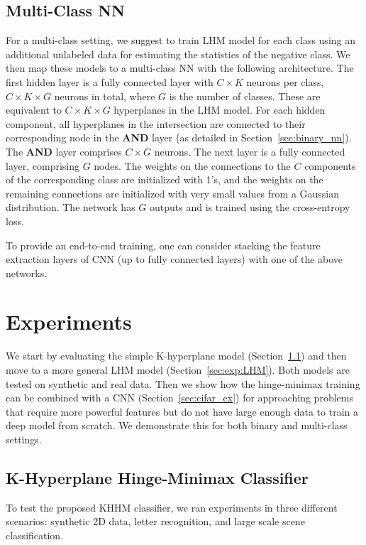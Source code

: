 \documentclass[twoside,11pt]{article}
\begin{document}
\subsection{Multi-Class NN}\label{sec:mc_nn}
For a multi-class setting, we suggest to train LHM model for each class using an additional unlabeled data for estimating the statistics of the negative class. We then map these models to a multi-class NN with the following architecture. The first hidden layer  is a fully connected layer with $C\times K$ neurons per class, $C\times K\times G$ neurons in total, where $G$ is the number of classes. These are  equivalent to  $C\times K\times G$ hyperplanes in the LHM model. For each hidden component, all hyperplanes in the intersection are connected to their corresponding node in the \textbf{AND} layer (as detailed in Section~\ref{sec:binary_nn}). The \textbf{AND} layer comprises $C\times G$ neurons. The next layer is a fully connected layer, comprising $G$ nodes. The weights on the connections to the $C$ components of the corresponding class are initialized with 1's, and the weights on the remaining connections are initialized with very small values from a Gaussian distribution.  The network has $G$ outputs and is trained using the cross-entropy loss.

To provide an end-to-end training, one can consider stacking the feature extraction layers of CNN (up to fully connected layers) with one of the above networks.


\section{Experiments}
We start by evaluating the simple K-hyperplane model (Section~\ref{sec:exp:KHHM}) and then move to a more general LHM model (Section~\ref{sec:exp:LHM}). Both models are tested on synthetic and real data. Then we show how the hinge-minimax training can be combined with a CNN (Section~\ref{sec:cifar_ex}) for approaching problems that require more powerful features but do not have large enough data to train a deep model from scratch. We demonstrate this for both binary and multi-class settings.

\subsection{K-Hyperplane Hinge-Minimax Classifier}\label{sec:exp:KHHM}
To test the proposed  KHHM classifier,
we ran experiments in three different scenarios: synthetic 2D data, letter recognition,
and large scale scene classification.
\end{document}
